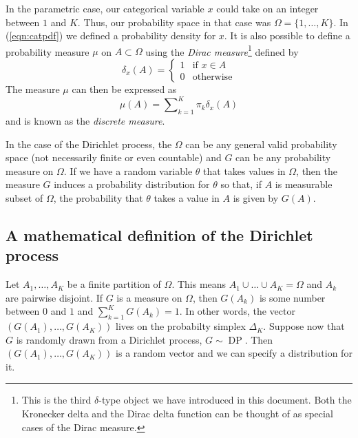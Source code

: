 \documentclass[final,3p,times,twocolumn]{elsarticle}
\DeclareMathOperator*{\DP}{DP}
\begin{document}
In the parametric case, our categorical variable $x$ could take on an integer between $1$ and $K$.
Thus, our probability space in that case was $\Omega = \{1,\dots,K\}$.
In (\ref{eqn:catpdf}) we defined a probability density for $x$.
It is also possible to define a probability measure $\mu$ on $A \subset \Omega$ using the \emph{Dirac measure}\footnote{This is the third $\delta$-type object we have introduced in this document.
Both the Kronecker delta and the Dirac delta function can be thought of as special cases of the Dirac measure.}
defined by
\begin{equation*}
\delta_x(A) = \left\{ \begin{array}{lr}
1 & \mbox{if $x \in A$} \\
0 & \mbox{otherwise}
\end{array} \right.
\end{equation*}
The measure $\mu$ can then be expressed as 
\begin{equation*}
\mu(A) = \sum\nolimits_{k=1}^K \pi_k \delta_x (A)
\end{equation*}
and is known as the \emph{discrete measure}. 

In the case of the Dirichlet process, the $\Omega$ can be any general valid probability space (not necessarily finite or even countable) and $G$ can be any probability measure on $\Omega$.
If we have a random variable $\theta$ that takes values in $\Omega$, then the measure $G$ induces a probability distribution for $\theta$ so that, if $A$ is measurable subset of $\Omega$, the probability that $\theta$ takes a value in $A$ is given by $G(A)$.


\subsection{A mathematical definition of the Dirichlet process}
Let $A_1,\dots,A_K$ be a finite partition of $\Omega$.
This means $A_1 \cup \dots \cup A_K = \Omega$ and $A_k$ are pairwise disjoint.
If $G$ is a measure on $\Omega$, then $G(A_k)$ is some number between $0$ and $1$ and $\sum_{k=1}^K G(A_k) = 1$.
In other words, the vector $(G(A_1),\dots,G(A_K))$ lives on the probabilty simplex $\Delta_K$.
Suppose now that $G$ is randomly drawn from a Dirichlet process, $G \sim \DP$.
Then $(G(A_1),\dots,G(A_K))$ is a random vector and we can specify a distribution for it.
\end{document}
